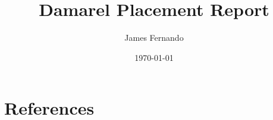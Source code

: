\documentclass[a4paper,12pt]{scrartcl}
\title{Damarel Placement Report}
\author{James Fernando}
\date{\today}
\begin{document}
	
	\begin{titlepage}
		\maketitle
	\end{titlepage}
	
	\tableofcontents
	\newpage
	
	
	
	
	
	
	
	
	
	
	
	
	
	\newpage
	
	\section{References}{
	\printbibliography
}
\end{document}
